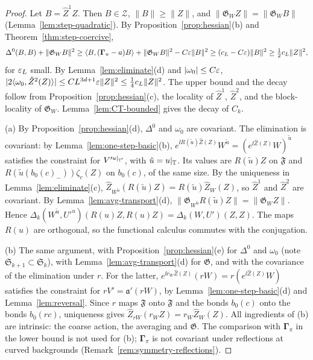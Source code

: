 \begin{proof}
Let $B=\hat Z^1Z$. Then $B\in\mathcal Z$, $\|B\|\ge\|Z\|$, and $\|\mathfrak G_WZ\|=\|\mathfrak G_WB\|$ (Lemma~\ref{lem:step-quadratic}). By Proposition~\ref{prop:hessian}(b) and Theorem~\ref{thm:step-coercive},
\[
\Delta^0(B,B)+\|\mathfrak G_WB\|^2\ge\langle B,(\boldsymbol\Gamma_\pi-a)B\rangle+\|\mathfrak G_WB\|^2-C\varepsilon\|B\|^2\ge(c_L-C\varepsilon)\|B\|^2\ge\tfrac12c_L\|Z\|^2,
\]
for $\varepsilon_L$ small. By Lemma~\ref{lem:eliminate}(d) and $|\omega_0|\le C\varepsilon$, $|2\langle \omega_0,\hat Z^2(Z)\rangle|\le CL^{3d+1}\varepsilon\|Z\|^2\le\frac14c_L\|Z\|^2$. The upper bound and the decay follow from Proposition~\ref{prop:hessian}(c), the locality of $\hat Z^1$, $\hat Z^2$, and the block-locality of $\mathfrak G_W$. Lemma~\ref{lem:CT-bounded} gives the decay of $C_k$.

(a) By Proposition~\ref{prop:hessian}(d), $\Delta^0$ and $\omega_0$ are covariant. The elimination is covariant: by Lemma~\ref{lem:one-step-basic}(b), $e^{\ii R(\tilde u)\hat Z(Z)}W^{\tilde u}=(e^{\ii\hat Z(Z)}W)^{\tilde u}$ satisfies the constraint for $V'^{u|_{\mathbb T'}}$, with $\tilde u=u|_\mathbb T$. Its values are $R(\tilde u)Z$ on $\mathfrak F$ and $R(\tilde u(b_0(c)_-))\zeta_c(Z)$ on $b_0(c)$, of the same size. By the uniqueness in Lemma~\ref{lem:eliminate}(c), $\hat Z_{W^{\tilde u}}(R(\tilde u)Z)=R(\tilde u)\hat Z_W(Z)$, so $\hat Z^1$ and $\hat Z^2$ are covariant. By Lemma~\ref{lem:avg-transport}(d), $\|\mathfrak G_{W^{\tilde u}}R(\tilde u)Z\|=\|\mathfrak G_WZ\|$. Hence $\Delta_k(W^{\tilde u},U'^u)(R(u)Z,R(u)Z)=\Delta_k(W,U')(Z,Z)$. The maps $R(u)$ are orthogonal, so the functional calculus commutes with the conjugation.

(b) The same argument, with Proposition~\ref{prop:hessian}(e) for $\Delta^0$ and $\omega_0$ (note $\mathfrak S_{k+1}\subset\mathfrak S_k$), with Lemma~\ref{lem:avg-transport}(d) for $\mathfrak G$, and with the covariance of the elimination under $r$. For the latter, $e^{\ii r_W\hat Z(Z)}(rW)=r(e^{\ii\hat Z(Z)}W)$ satisfies the constraint for $rV'=\mathfrak a'(rW)$, by Lemma~\ref{lem:one-step-basic}(d) and Lemma~\ref{lem:reversal}. Since $r$ maps $\mathfrak F$ onto $\mathfrak F$ and the bonds $b_0(c)$ onto the bonds $b_0(rc)$, uniqueness gives $\hat Z_{rW}(r_WZ)=r_W\hat Z_W(Z)$. All ingredients of (b) are intrinsic: the coarse action, the averaging and $\mathfrak G$. The comparison with $\boldsymbol\Gamma_\pi$ in the lower bound is not used for (b); $\boldsymbol\Gamma_\pi$ is not covariant under reflections at curved backgrounds (Remark~\ref{rem:symmetry-reflections}).


\end{proof}
